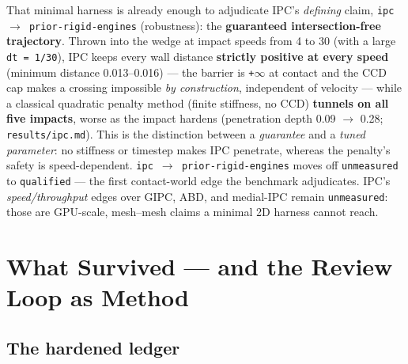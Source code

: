 \documentclass{egpubl}
\begin{document}
That minimal harness is already enough to adjudicate IPC's \emph{defining} claim, \texttt{ipc $\rightarrow$ prior-rigid-engines}
(robustness): the \textbf{guaranteed intersection-free trajectory}. Thrown into the wedge at impact speeds
from 4 to 30 (with a large \texttt{dt = 1/30}), IPC keeps every wall distance \textbf{strictly positive at every
speed} (minimum distance 0.013--0.016) --- the barrier is \texttt{+$\infty$} at contact and the CCD cap makes a
crossing impossible \emph{by construction}, independent of velocity --- while a classical quadratic penalty
method (finite stiffness, no CCD) \textbf{tunnels on all five impacts}, worse as the impact hardens
(penetration depth 0.09 $\rightarrow$ 0.28; \texttt{results/ipc.md}). This is the distinction between a \emph{guarantee} and a
\emph{tuned parameter}: no stiffness or timestep makes IPC penetrate, whereas the penalty's safety is
speed-dependent. \texttt{ipc $\rightarrow$ prior-rigid-engines} moves off \texttt{unmeasured} to \texttt{qualified} --- the first
contact-world edge the benchmark adjudicates. IPC's \emph{speed/throughput} edges over GIPC, ABD, and
medial-IPC remain \texttt{unmeasured}: those are GPU-scale, mesh--mesh claims a minimal 2D harness cannot reach.


\section{What Survived --- and the Review Loop as Method}

\subsection{The hardened ledger}
\end{document}
